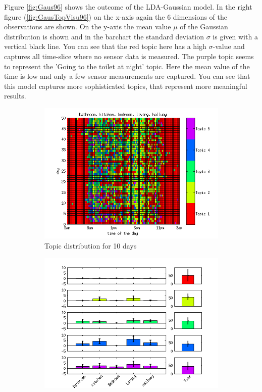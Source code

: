 \documentclass[11pt,a4paper]{article}
\begin{document}
Figure \ref{fig:Gaus96} shows the outcome of the LDA-Gaussian model. In the right figure (\ref{fig:GausTopVisu96}) on the x-axis again the 6 dimensions of the observations are shown. On the y-axis the mean value $\mu$ of the Gaussian distribution is shown and in the barchart the standard deviation $\sigma$ is given with a vertical black line. You can see that the red topic here has a high $\sigma$-value and captures all time-slice where no sensor data is measured. The purple topic seems to represent the 'Going to the toilet at night' topic. Here the mean value of the time is low and only a few sensor measurements are captured. You can see that this model captures more sophisticated topics, that represent more meaningful results.

\begin{figure}[h!]
 \centering
 \begin{subfigure}[b]{0.45\linewidth}
  \centering
  \includegraphics[width=\textwidth]{Pictures/TopDayTS96k5Gaus.png}
  \caption{Topic distribution for 10 days}
 \end{subfigure}
 \begin{subfigure}[b]{0.45\linewidth}
  \centering
  \includegraphics[width=\textwidth]{Pictures/TopVisuTS96k5Gaus.png}

\end{subfigure}
\end{figure}
\end{document}
